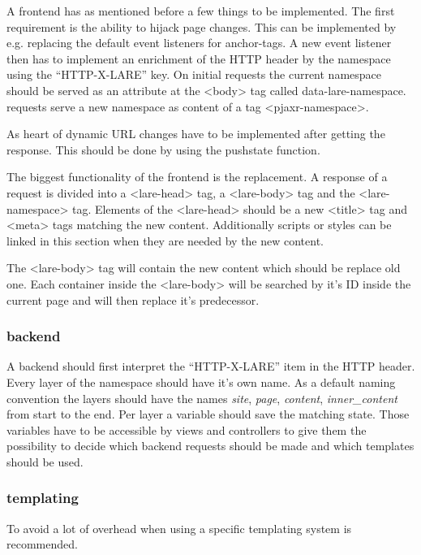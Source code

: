 A \lare{} frontend has as mentioned before a few things to be implemented.
The first requirement is the ability to hijack page changes.
This can be implemented by e.g. replacing the default event listeners for anchor-tags.
A new event listener then has to implement an enrichment of the HTTP header by the namespace using the \enquote{HTTP-X-LARE} key.
On initial requests the current namespace should be served as an attribute at the <body> tag called data-lare-namespace.
\lare{} requests serve a new namespace as content of a tag <pjaxr-namespace>.

As heart of \lare{} dynamic URL changes have to be implemented after getting the response.
This should be done by using the pushstate function.

The biggest functionality of the \lare{} frontend is the replacement.
A response of a \lare{} request is divided into a <lare-head> tag, a <lare-body> tag and the <lare-namespace> tag.
Elements of the <lare-head> should be a new <title> tag and <meta> tags matching the new content. 
Additionally scripts or styles can be linked in this section when they are needed by the new content.

The <lare-body> tag will contain the new content which should be replace old one.
Each container inside the <lare-body> will be searched by it's ID inside the current page and will then replace it's predecessor.

\subsubsection{\lare{} backend}

A \lare{} backend should first interpret the \enquote{HTTP-X-LARE} item in the HTTP header.
Every layer of the namespace should have it's own name.
As a default naming convention the layers should have the names \emph{site}, \emph{page}, \emph{content}, \emph{inner\_content} from start to the end.
Per layer a variable should save the matching state.
Those variables have to be accessible by views and controllers to give them the possibility to decide which backend requests should be made and which templates should be used.

\subsubsection{\lare{} templating}

To avoid a lot of overhead when using \lare{} a specific templating system is recommended.

